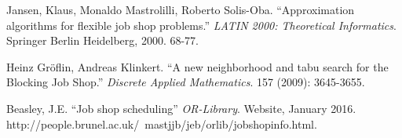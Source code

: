 \documentclass[a4paper,12pt]{article}
\begin{document}
\begin{thebibliography}{9}

	Jansen, Klaus, Monaldo Mastrolilli, Roberto Solis-Oba.
	``Approximation algorithms for flexible job shop problems.''
	\textit{LATIN 2000: Theoretical Informatics}. Springer Berlin Heidelberg, 2000. 68-77.

	Heinz Gr{\"o}flin, Andreas Klinkert.
	``A new neighborhood and tabu search for the Blocking Job Shop.''
	\textit{Discrete Applied Mathematics}. 157 (2009): 3645-3655.

	Beasley, J.E. 
	``Job shop scheduling''
	\textit{OR-Library}.
	Website, January 2016. http://people.brunel.ac.uk/~mastjjb/jeb/orlib/jobshopinfo.html.

\end{thebibliography}
\end{document}
